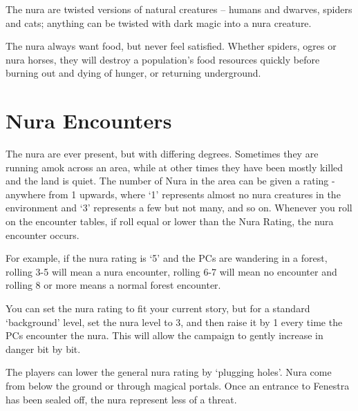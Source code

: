 \label{nura}
The nura are twisted versions of natural creatures -- humans and dwarves, spiders and cats; anything can be twisted with dark magic into a nura creature.

The nura always want food, but never feel satisfied.  Whether spiders, ogres or nura horses, they will destroy a population's food resources quickly before burning out and dying of hunger, or returning underground.

\section{Nura Encounters}

The nura are ever present, but with differing degrees.  Sometimes they are running amok across an area, while at other times they have been mostly killed and the land is quiet.  The number of Nura in the area can be given a rating - anywhere from 1 upwards, where `1' represents almost no nura creatures in the environment and `3' represents a few but not many, and so on.  Whenever you roll on the encounter tables, if roll equal or lower than the Nura Rating, the nura encounter occurs.

	For example, if the nura rating is `5' and the PCs are wandering in a forest, rolling 3-5 will mean a nura encounter, rolling 6-7 will mean no encounter and rolling 8 or more means a normal forest encounter.

	You can set the nura rating to fit your current story, but for a standard `background' level, set the nura level to 3, and then raise it by 1 every time the PCs encounter the nura.  This will allow the campaign to gently increase in danger bit by bit.

The players can lower the general nura rating by `plugging holes'.  Nura come from below the ground or through magical portals.  Once an entrance to Fenestra has been sealed off, the nura represent less of a threat.

